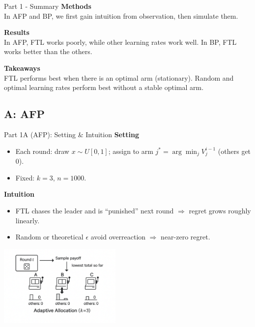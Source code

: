 \documentclass{beamer}
\begin{document}
\begin{frame}{Part 1 - Summary}
\textbf{Methods}\\
In AFP and BP, we first gain intuition from observation, then simulate them.

\vspace{0.7em}
\textbf{Results}\\
In AFP, FTL works poorly, while other learning rates work well. In BP, FTL works better than the others.

\vspace{0.7em}
\textbf{Takeaways}\\
FTL performs best when there is an optimal arm (stationary). Random and optimal learning rates perform best without a stable optimal arm.
\end{frame}

\subsection{A: AFP}

\begin{frame}{Part 1A (AFP): Setting \& Intuition}
\textbf{Setting}
\begin{itemize}
  \item Each round: draw $x\sim U[0,1]$; assign to arm $j^*=\arg\min_j V_{j}^{i-1}$ (others get $0$).
  \item Fixed: $k=3$, $n=1000$.
\end{itemize}
\textbf{Intuition}
\begin{itemize}
  \item FTL chases the leader and is “punished” next round $\Rightarrow$ regret grows roughly linearly.
  \item Random or theoretical $\epsilon$ avoid overreaction $\Rightarrow$ near-zero regret.
\end{itemize}
\centering
\includegraphics[width=0.45\textwidth]{../figures/Image_A.png}
\end{frame}
\end{document}
